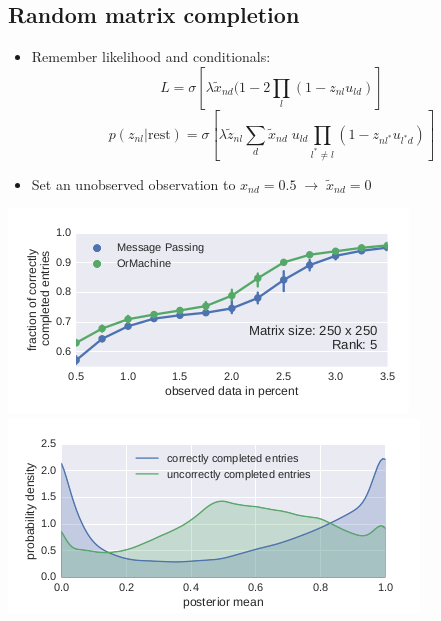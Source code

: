 \documentclass[11pt]{article}
\begin{document}
\subsection*{Random matrix completion}
\label{sec-4-2}
\begin{itemize}
\item Remember likelihood and conditionals: $$L = \sigma\left[\lambda \tilde{x}_{nd} (1-2\prod\limits_{l}(1-z_{nl}u_{ld}) \right]$$ $$ p(z_{nl}|\text{rest}) = \sigma\left[\lambda \tilde{z}_{nl} \sum\limits_d \tilde{x}_{nd}\; u_{ld}\prod\limits_{l^*\neq l} (1-z_{nl^*}u_{l^*d})\right] $$
\item Set an unobserved observation to $x_{nd} = 0.5 \;\rightarrow\; \tilde{x}_{nd}=0$
\end{itemize}
\includegraphics[width=.9\linewidth]{./completion1.png}
\includegraphics[width=.9\linewidth]{./completion2.png}
\end{document}
